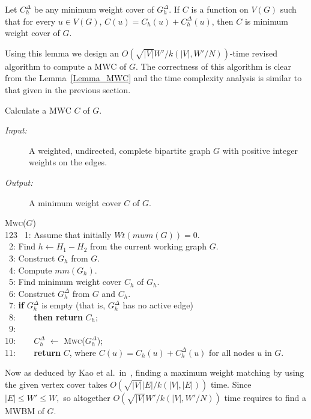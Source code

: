 \documentclass[runningheads,a4paper]{llncs}
\begin{document}
\begin{lemma} \label{Lemma_MWC}
Let $C_h^\Delta$ be any minimum weight cover of $G_h^\Delta$. If $C$ is
a function on $V(G)$ such that for every $u \in V(G)$, $C(u)=C_h(u) +
C_h^\Delta(u) $, then $C$ is minimum weight cover of $G$.
\end{lemma}

Using this lemma we design an $O(\sqrt{|V|}W'/k(|V|,W'/{N}))$-time
revised algorithm to compute a MWC of $G$. The correctness of this
algorithm is clear from the Lemma~\ref{Lemma_MWC} and the time
complexity analysis is similar to that given in the previous section.

\begin{algorithm}[H]
\caption{Calculate a MWC $C$ of $G$.}
\label{Algorithm2}
\begin{description}
\item[\it Input:] A weighted, undirected, complete bipartite graph $G$ with positive  integer weights on the edges.
\item[\it Output:] A minimum weight cover $C$ of $G$.
\end{description}

\begin{tabbing}
{\textsc{Mwc}($G$)}\\
123\=\+\kill
~1: Assume that initially $\textit{Wt}(\textit{mwm}(G))=0$.\\
~2: Find $h \leftarrow H_1-H_2$ from the current working graph $G$.\\
~3: Construct $G_h$ from $G$.\\
~4: Compute $\textit{mm}(G_h)$.\\
~5: Find minimum weight cover $C_h$ of $G_h$.\\
~6: Construct $G_h^\Delta$ from $G$ and $C_h$.\\
~7: \= {\bf if} $G_h^\Delta$ is empty (that is, $G_h^\Delta$ has no active edge)\\
~8:   \>~~~ {\bf then return}   $C_h$;\\
~9:   \\10:      \>~~~ $C_h^\Delta$ $\leftarrow$  \textsc{Mwc}($G_h^\Delta$);\\
11:      \>~~~ {\bf return} $C$, where $C(u)=C_h(u)+C_h^\Delta(u)$ for all nodes $u$ in $G$.
\end{tabbing}
\end{algorithm}

Now as deduced by Kao et al.\ in~\cite{kao02}, finding a maximum weight matching by using the given vertex cover takes 
$O(\sqrt{|V|}|E|/k(|V|,|E|))$ time.
Since $|E| \leq W' \leq W,$ so altogether 
$O(\sqrt{|V|}W'/k(|V|,W'/{N}))$ time requires to find a MWBM of $G$.
\end{document}
